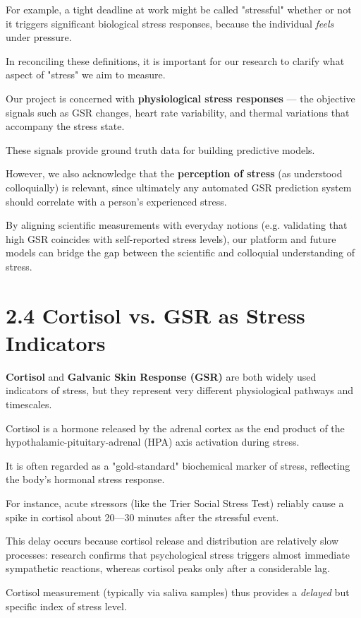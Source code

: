 For example, a tight deadline at work might be called "stressful" whether or not it triggers significant biological stress responses, because the individual \textit{feels} under pressure.

In reconciling these definitions, it is important for our research to clarify what aspect of "stress" we aim to measure.

Our project is concerned with \textbf{physiological stress responses}
 --- the objective signals such as GSR changes, heart rate variability, and thermal variations that accompany the stress state.

These signals provide ground truth data for building predictive models.

However, we also acknowledge that the \textbf{perception of stress}
 (as understood colloquially) is relevant, since ultimately any automated GSR prediction system should correlate with a person's experienced stress.

By aligning scientific measurements with everyday notions (e.g. validating that high GSR coincides with self-reported stress levels), our platform and future models can bridge the gap between the scientific and colloquial understanding of stress.

\section{2.4 Cortisol vs. GSR as Stress Indicators}

 \textbf{Cortisol}
 and \textbf{Galvanic Skin Response (GSR)}
 are both widely used indicators of stress, but they represent very different physiological pathways and timescales.

Cortisol is a hormone released by the adrenal cortex as the end product of the hypothalamic-pituitary-adrenal (HPA) axis activation during stress.

It is often regarded as a "gold-standard" biochemical marker of stress, reflecting the body's hormonal stress response.

For instance, acute stressors (like the Trier Social Stress Test) reliably cause a spike in cortisol about 20---30 minutes after the stressful event.

This delay occurs because cortisol release and distribution are relatively slow processes: research confirms that psychological stress triggers almost immediate sympathetic reactions, whereas cortisol peaks only after a considerable lag.

Cortisol measurement (typically via saliva samples) thus provides a \textit{delayed} but specific index of stress level.

